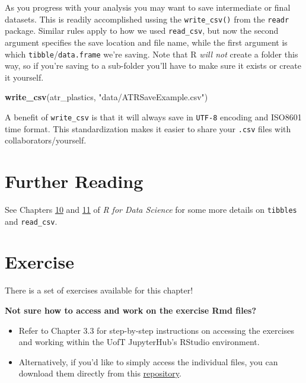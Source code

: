 \documentclass[
]{book}
\newenvironment{Shaded}{\begin{snugshade}}{\end{snugshade}}
\newcommand{\FunctionTok}[1]{\textcolor[rgb]{0.13,0.29,0.53}{\textbf{#1}}}
\newcommand{\NormalTok}[1]{#1}
\newcommand{\StringTok}[1]{\textcolor[rgb]{0.31,0.60,0.02}{#1}}
\begin{document}
As you progress with your analysis you may want to save intermediate or final datasets. This is readily accomplished ussing the \texttt{write\_csv()} from the \texttt{readr} package. Similar rules apply to how we used \texttt{read\_csv}, but now the second argument specifies the save location and file name, while the first argument is which \texttt{tibble}/\texttt{data.frame} we're saving. Note that R \emph{will not} create a folder this way, so if you're saving to a sub-folder you'll have to make sure it exists or create it yourself.

\begin{Shaded}
\begin{Highlighting}[]
\FunctionTok{write\_csv}\NormalTok{(atr\_plastics, }\StringTok{"data/ATRSaveExample.csv"}\NormalTok{)}
\end{Highlighting}
\end{Shaded}

A benefit of \texttt{write\_csv} is that it will always save in \texttt{UTF-8} encoding and ISO8601 time format. This standardization makes it easier to share your \texttt{.csv} files with collaborators/yourself.

\hypertarget{further-reading-2}{%
\section{Further Reading}\label{further-reading-2}}

See Chapters \href{https://r4ds.had.co.nz/tibbles.html}{10} and \href{https://r4ds.had.co.nz/data-import.html}{11} of \emph{R for Data Science} for some more details on \texttt{tibbles} and \texttt{read\_csv}.

\hypertarget{exercise-5}{%
\section{Exercise}\label{exercise-5}}

There is a set of exercises available for this chapter!

\textbf{Not sure how to access and work on the exercise Rmd files? }

\begin{itemize}
\item
  Refer to Chapter 3.3 for step-by-step instructions on accessing the exercises and working within the UofT JupyterHub's RStudio environment.
\item
  Alternatively, if you'd like to simply access the individual files, you can download them directly from this \href{https://github.com/UofTChem-Teaching/R4EnvChem-Exercises}{repository}.
\end{itemize}
\end{document}
